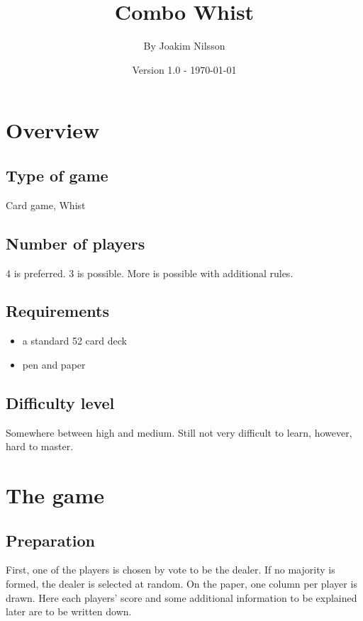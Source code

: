 \documentclass[a4paper]{article}
\title{Combo Whist}
\author{By Joakim Nilsson}
\date{Version 1.0 - \today}
\begin{document}
	\maketitle
	\thispagestyle{empty}
	\pagebreak
	
	\setcounter{tocdepth}{3}
	\tableofcontents
	\thispagestyle{empty}
	\pagebreak
	
	\section{Overview}
		\subsection{Type of game}
		Card game, Whist
		
		\subsection{Number of players}
		4 is preferred. 3 is possible. More is possible with additional rules.
		
		\subsection{Requirements}
		\begin{itemize}
			\item a standard 52 card deck
			\item pen and paper
		\end{itemize}
		
		\subsection{Difficulty level}
		Somewhere between high and medium. Still not very difficult to learn, however, hard to master.

	\section{The game}
		\subsection{Preparation}
		First, one of the players is chosen by vote to be the dealer. If no majority is formed, the dealer is selected at random. On the paper, one column per player is drawn. Here each players' score and some additional information to be explained later are to be written down.
\end{document}
